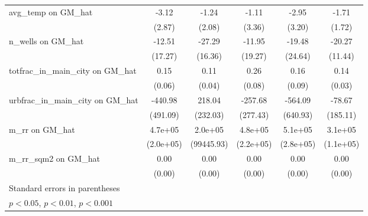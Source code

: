 {\begin{tabular}{l*{5}{c}}
\addlinespace
avg\_temp on GM\_hat&    -3.12         &    -1.24         &    -1.11         &    -2.95         &    -1.71         \\
                &   (2.87)         &   (2.08)         &   (3.36)         &   (3.20)         &   (1.72)         \\
\addlinespace
n\_wells on GM\_hat&   -12.51         &   -27.29         &   -11.95         &   -19.48         &   -20.27         \\
                &  (17.27)         &  (16.36)         &  (19.27)         &  (24.64)         &  (11.44)         \\
\addlinespace
totfrac\_in\_main\_city on GM\_hat&     0.15\sym{*}  &     0.11\sym{**} &     0.26\sym{**} &     0.16         &     0.14\sym{***}\\
                &   (0.06)         &   (0.04)         &   (0.08)         &   (0.09)         &   (0.03)         \\
\addlinespace
urbfrac\_in\_main\_city on GM\_hat&  -440.98         &   218.04         &  -257.68         &  -564.09         &   -78.67         \\
                & (491.09)         & (232.03)         & (277.43)         & (640.93)         & (185.11)         \\
\addlinespace
m\_rr on GM\_hat  &  4.7e+05\sym{*}  &  2.0e+05\sym{*}  &  4.8e+05\sym{*}  &  5.1e+05         &  3.1e+05\sym{**} \\
                &(2.0e+05)         &(99445.93)         &(2.2e+05)         &(2.8e+05)         &(1.1e+05)         \\
\addlinespace
m\_rr\_sqm2 on GM\_hat&     0.00\sym{*}  &     0.00\sym{**} &     0.00\sym{**} &     0.00         &     0.00\sym{***}\\
                &   (0.00)         &   (0.00)         &   (0.00)         &   (0.00)         &   (0.00)         \\
\bottomrule
\multicolumn{6}{l}{\footnotesize Standard errors in parentheses}\\
\multicolumn{6}{l}{\footnotesize \sym{*} \(p<0.05\), \sym{**} \(p<0.01\), \sym{***} \(p<0.001\)}\\
\end{tabular}
}
